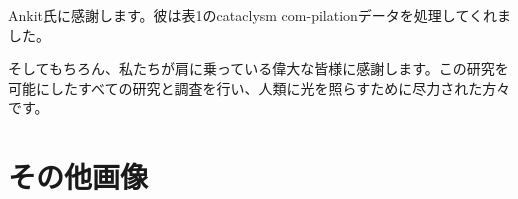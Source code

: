 \documentclass[10pt,twocolumn,letterpaper]{article}
\begin{document}
Ankit氏に感謝します。彼は表1のcataclysm com-pilationデータを処理してくれました。

そしてもちろん、私たちが肩に乗っている偉大な皆様に感謝します。この研究を可能にしたすべての研究と調査を行い、人類に光を照らすために尽力された方々です。

\clearpage
\twocolumn

\section{その他画像}



\end{document}
